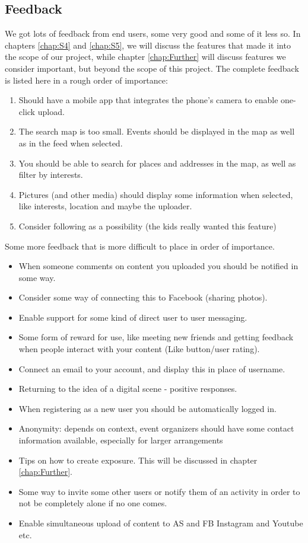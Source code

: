 \subsection{Feedback}
\label{subsec:S2PresentationFeedback}

We got lots of feedback from end users, some very good and some of it less so.  In chapters \ref{chap:S4} and \ref{chap:S5}, we will discuss the features that made it into the scope of our project, while chapter \ref{chap:Further} will discuss features we consider important, but beyond the scope of this project. The complete feedback is listed here in a rough order of importance:

\begin{enumerate}
  \item Should have a mobile app that integrates the phone's camera to enable one-click upload.
  \item The search map is too small. Events should be displayed in the map as well as in the feed when selected.
  \item You should be able to search for places and addresses in the map, as well as filter by interests.
  \item Pictures (and other media) should display some information when selected, like interests, location and maybe the uploader.
  \item Consider following as a possibility (the kids really wanted this feature) 
\end{enumerate}

Some more feedback that is more difficult to place in order of importance.

\begin{itemize}
  \item When someone comments on content you uploaded you should be notified in some way.
  \item Consider some way of connecting this to Facebook (sharing photos).
  \item Enable support for some kind of direct user to user messaging.
  \item Some form of reward for use, like meeting new friends and getting feedback when people interact with your content (Like button/user rating).
  \item Connect an email to your account, and display this in place of username.
  \item Returning to the idea of a digital scene - positive responses.
  \item When registering as a new user you should be automatically logged in.
  \item Anonymity: depends on context, event organizers should have some contact information available, especially for larger arrangements
  \item Tips on how to create exposure. This will be discussed in chapter \ref{chap:Further}.
  \item Some way to invite some other users or notify them of an activity in order to not be completely alone if no one comes.
  \item Enable simultaneous upload of content to AS and FB Instagram and Youtube etc.
\end{itemize}


